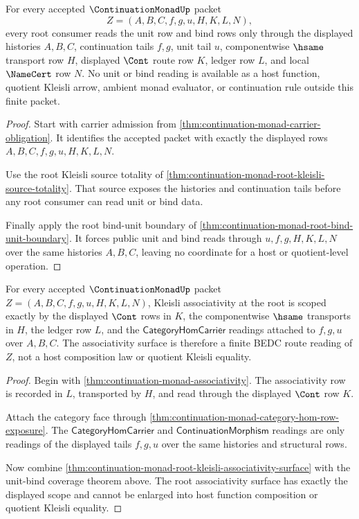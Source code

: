 \begin{theorem}
\label{thm:continuation-monad-root-unit-bind-coverage}
For every accepted $\ContinuationMonadUp$ packet
$$
Z=(A,B,C,f,g,u,H,K,L,N),
$$
every root consumer reads the unit row and bind rows only through the displayed histories $A,B,C$, continuation tails $f,g$, unit tail $u$, componentwise $\hsame$ transport row $H$, displayed $\Cont$ route row $K$, ledger row $L$, and local $\NameCert$ row $N$. No unit or bind reading is available as a host function, quotient Kleisli arrow, ambient monad evaluator, or continuation rule outside this finite packet.
\end{theorem}
\begin{proof}
Start with carrier admission from \autoref{thm:continuation-monad-carrier-obligation}. It identifies the accepted packet with exactly the displayed rows $A,B,C,f,g,u,H,K,L,N$.

Use the root Kleisli source totality of \autoref{thm:continuation-monad-root-kleisli-source-totality}. That source exposes the histories and continuation tails before any root consumer can read unit or bind data.

Finally apply the root bind-unit boundary of \autoref{thm:continuation-monad-root-bind-unit-boundary}. It forces public unit and bind reads through $u,f,g,H,K,L,N$ over the same histories $A,B,C$, leaving no coordinate for a host or quotient-level operation.
\end{proof}

\begin{theorem}
\label{thm:continuation-monad-root-kleisli-associativity-scope}
For every accepted $\ContinuationMonadUp$ packet $Z=(A,B,C,f,g,u,H,K,L,N)$, Kleisli associativity at the root is scoped exactly by the displayed $\Cont$ rows in $K$, the componentwise $\hsame$ transports in $H$, the ledger row $L$, and the $\mathsf{CategoryHomCarrier}$ readings attached to $f,g,u$ over $A,B,C$. The associativity surface is therefore a finite BEDC route reading of $Z$, not a host composition law or quotient Kleisli equality.
\end{theorem}
\begin{proof}
Begin with \autoref{thm:continuation-monad-associativity}. The associativity row is recorded in $L$, transported by $H$, and read through the displayed $\Cont$ row $K$.

Attach the category face through \autoref{thm:continuation-monad-category-hom-row-exposure}. The $\mathsf{CategoryHomCarrier}$ and $\mathsf{ContinuationMorphism}$ readings are only readings of the displayed tails $f,g,u$ over the same histories and structural rows.

Now combine \autoref{thm:continuation-monad-root-kleisli-associativity-surface} with the unit-bind coverage theorem above. The root associativity surface has exactly the displayed scope and cannot be enlarged into host function composition or quotient Kleisli equality.
\end{proof}

